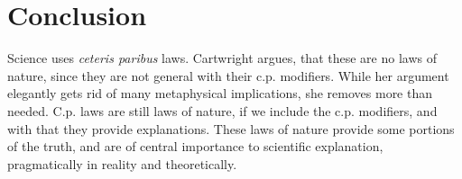 \section*{Conclusion}
Science uses \emph{ceteris paribus} laws.
Cartwright argues, that these are no laws of nature,
since they are not general with their c.p. modifiers.
While her argument elegantly gets rid of many
metaphysical implications, she removes more
than needed.
C.p. laws are still laws of nature, if we include the
c.p. modifiers, and with that they provide explanations.
These laws of nature provide some portions of the truth,
and are of central importance to scientific
explanation, pragmatically in reality and theoretically.